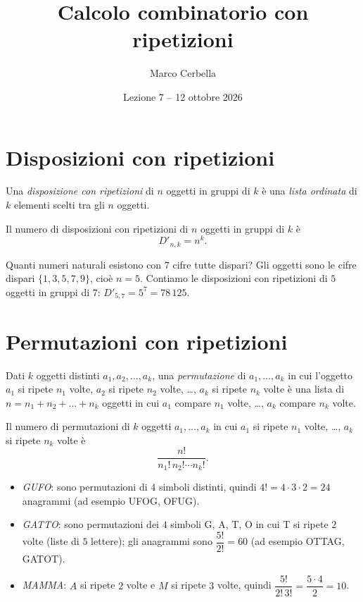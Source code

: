 \documentclass[11pt,a4paper]{article}
\title{Calcolo combinatorio con ripetizioni}
\author{Marco Cerbella}
\date{Lezione 7 -- 12 ottobre 2026}
\begin{document}
\maketitle

\section{Disposizioni con ripetizioni}

\begin{definizione}
Una \emph{disposizione con ripetizioni} di $n$ oggetti in gruppi di $k$ è una \emph{lista ordinata} di $k$ elementi scelti tra gli $n$ oggetti.
\end{definizione}

\begin{proposizione}
Il numero di disposizioni con ripetizioni di $n$ oggetti in gruppi di $k$ è
\[
D'_{n,k} = n^k .
\]
\end{proposizione}

\begin{esempio}
Quanti numeri naturali esistono con $7$ cifre tutte dispari? Gli oggetti sono le cifre dispari $\{1, 3, 5, 7, 9\}$, cioè $n = 5$. Contiamo le disposizioni con ripetizioni di $5$ oggetti in gruppi di $7$: $D'_{5,7} = 5^7 = 78\,125$.
\end{esempio}

\section{Permutazioni con ripetizioni}

\begin{definizione}
Dati $k$ oggetti distinti $a_1, a_2, \dots, a_k$, una \emph{permutazione} di $a_1, \dots, a_k$ in cui l'oggetto $a_1$ si ripete $n_1$ volte, $a_2$ si ripete $n_2$ volte, \dots, $a_k$ si ripete $n_k$ volte è una lista di $n = n_1 + n_2 + \dots + n_k$ oggetti in cui $a_1$ compare $n_1$ volte, \dots, $a_k$ compare $n_k$ volte.
\end{definizione}

\begin{proposizione}
Il numero di permutazioni di $k$ oggetti $a_1, \dots, a_k$ in cui $a_1$ si ripete $n_1$ volte, \dots, $a_k$ si ripete $n_k$ volte è
\[
\frac{n!}{n_1!\, n_2! \cdots n_k!} .
\]
\end{proposizione}

\begin{esempio}[Anagrammi]
\leavevmode
\begin{itemize}
    \item \emph{GUFO}: sono permutazioni di $4$ simboli distinti, quindi $4! = 4 \cdot 3 \cdot 2 = 24$ anagrammi (ad esempio UFOG, OFUG).
    \item \emph{GATTO}: sono permutazioni dei $4$ simboli G, A, T, O in cui T si ripete $2$ volte (liste di $5$ lettere); gli anagrammi sono $\dfrac{5!}{2!} = 60$ (ad esempio OTTAG, GATOT).
    \item \emph{MAMMA}: $A$ si ripete $2$ volte e $M$ si ripete $3$ volte, quindi $\dfrac{5!}{2!\,3!} = \dfrac{5 \cdot 4}{2} = 10$.
\end{itemize}
\end{esempio}
\end{document}
